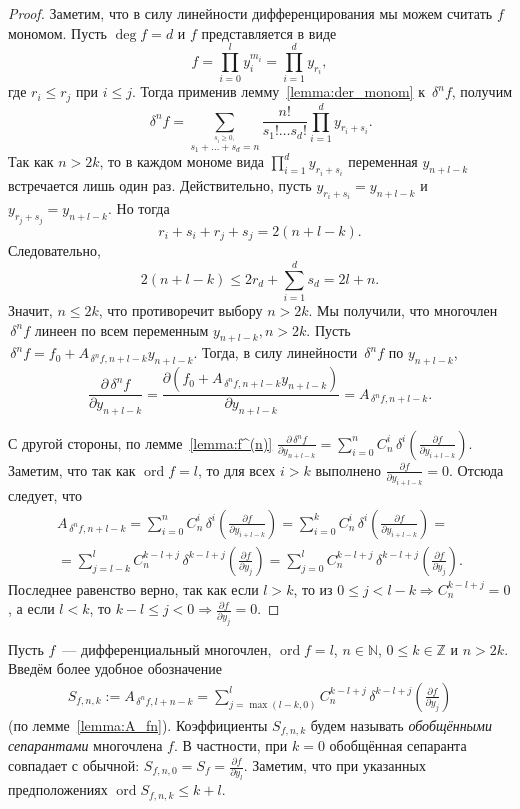 \documentclass[11pt]{article}
\DeclareMathOperator{\ord}{ord}
\renewcommand{\le}{\leqslant}
\renewcommand{\ge}{\geqslant}
\theoremstyle{plain}
\theoremstyle{definition}
\theoremstyle{remark}
\begin{document}
\begin{proof}
Заметим, что в силу линейности дифференцирования мы можем считать
$f$ мономом. Пусть $\deg f = d$ и $f$ представляется в
виде
$$
f=\prod\limits_{i=0}^ly_i^{m_i}=\prod\limits_{i=1}^{d}y_{r_i},
$$
где $r_i\le r_j$ при $i \le j$. Тогда применив лемму~\ref{lemma:der_monom} к $\,\delta^n f$,
получим
$$
\,\delta^n f=\sum\limits_{\stackrel{s_i\ge0,}{
s_1+\ldots+s_d=n}}\frac{n!}{s_1!\ldots s_d!}
\prod\limits_{i=1}^dy_{r_i+s_i}.
$$
Так как $n>2k$, то в каждом мономе вида $\prod_{i=1}^d y_{r_i+s_i}$
переменная $y_{n+l-k}$ встречается лишь один раз. Действительно, пусть
$y_{r_i+s_i}=y_{n+l-k}$ и $y_{r_j+s_j}=y_{n+l-k}$. Но тогда
$$
r_i+s_i+r_j+s_j = 2(n+l-k).
$$
Следовательно,
$$
2(n+l-k)\le 2r_d + \sum_{i=1}^d s_d = 2l +n.
$$
Значит, $n \le 2k$, что противоречит выбору $n>2k$. Мы получили, что многочлен $\,\delta^n f$ линеен по всем переменным $y_{n+l-k},n>2k $. Пусть $\,\delta^n f=f_0+A_{\,\delta^n f,n+l-k}y_{n+l-k}$. Тогда, в силу линейности $\,\delta^n f$ по $y_{n+l-k}$,
$$
\frac{\partial \,\delta^n f}{\partial y_{n+l-k}}=\frac{\partial (f_0+A_{\,\delta^n f,n+l-k}y_{n+l-k})}{\partial y_{n+l-k}}=A_{\,\delta^n f,n+l-k}.
$$

С другой стороны, по лемме~\ref{lemma:f^(n)} $\frac{\partial \,\delta^n f}{\partial y_{n+l-k}}= \sum\limits_{i=0}^n  C_n^i  \,\delta^i\left(\frac{\partial f}{\partial y_{i+l-k}}\right)$. Заметим, что так как $\ord f = l$, то для всех $i>k$ выполнено $\frac{\partial f}{\partial y_{i+l-k}}=0$. Отсюда следует, что 
\begin{gather*}
A_{\,\delta^n f,n+l-k}=\sum\limits_{i=0}^n  C_n^i  \,\delta^i\left(\frac{\partial f}{\partial y_{i+l-k}}\right)=\sum\limits_{i=0}^k  C_n^i  \,\delta^i \left(\frac{\partial f}{\partial y_{i+l-k}}\right)=\\
=\sum\limits_{j=l-k}^l  C_n^{k-l+j}  \,\delta^{k-l+j}\left(\frac{\partial f}{\partial y_{j}}\right)=\sum\limits_{j=0}^{l}C_n^{k - l + j
}\,\delta^{k-l+j}\left(\frac{\partial f}{\partial y_j}\right).
\end{gather*}
Последнее равенство верно, так как если $l>k$, то из $0 \le j<l-k \Longrightarrow C_n^{k-l+j}=0$, а если $l<k$, то  $k-l\le j<0 \Longrightarrow \frac{\partial f}{\partial y_{j}}=0$. 
\end{proof}

Пусть $f$~--- дифференциальный многочлен, $\ord f = l$, $n\in\mathbb{N}$, $0\le k\in\mathbb{Z}$ и $n>2k$.
Введём более удобное обозначение
\begin{gather*}
 S_{f,n,k} := A_{\,\delta^n f, l+n-k} = \sum_{j=\max(l-k,0)}^l C_{n}^{k-l+j} \,\delta^{k-l+j}\left(\frac{\partial f}{\partial y_{j}}\right)
\end{gather*}
(по лемме~\ref{lemma:A_fn}).
Коэффициенты $S_{f,n,k}$ будем называть \emph{обобщёнными сепарантами} многочлена $f$.
В частности, при $k=0$ обобщённая сепаранта совпадает с обычной: $S_{f,n,0}=S_f = \frac{\partial f}{\partial y_l}$. 
Заметим, что при указанных предположениях $\ord S_{f,n,k} \le k+l$.
\end{document}
